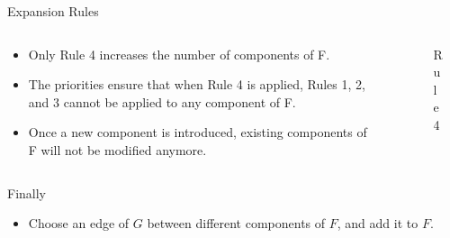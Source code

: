 \documentclass{beamer}
\begin{document}
\begin{frame}{Expansion Rules}
\begin{columns}
    \begin{column}{0.7\textwidth}
        \begin{itemize}[<+->]
            \item Only Rule 4 increases the number of components of F.
            \item The priorities ensure that when Rule 4 is applied,
Rules 1, 2, and 3 cannot be applied to any component of F.
            \item Once a new component is introduced, existing components
of F will not be modified anymore.
        \end{itemize}
    \end{column}
    \begin{column}{0.3\textwidth}
        \begin{figure}
            \caption{Rule 4}
        \end{figure}
    \end{column}
\end{columns}
\end{frame}

\begin{frame}{Finally}
\begin{itemize}
    \item Choose an edge of $G$ between different components of $F$, and add it to $F$.
\end{itemize}
\end{frame}
\end{document}
